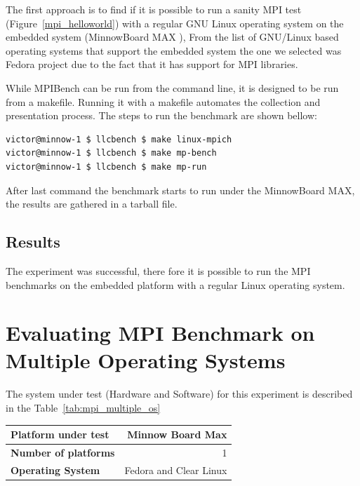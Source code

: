 The first approach is  to find if it is possible to run a sanity MPI test
(Figure~\ref{mpi_helloworld}) with a regular GNU Linux operating system on the embedded
system (MinnowBoard MAX \cite{minnowboard}),  From the list of GNU/Linux
based operating systems that support the embedded system \cite{minnowboard}
the one we selected was Fedora \cite{fedora} project due to the fact that it
has support for MPI libraries.

While MPIBench can be run from the command line, it is designed to be run from
a makefile. Running it with a makefile automates the collection and
presentation process. The steps to run the benchmark are shown bellow: 

\begin{minipage}{\textwidth}
\end{minipage}

\begin{minipage}{\textwidth}
\begin{lstlisting}[frame=single]
victor@minnow-1 $ llcbench $ make linux-mpich
victor@minnow-1 $ llcbench $ make mp-bench
victor@minnow-1 $ llcbench $ make mp-run
\end{lstlisting}
\end{minipage}

After last command the benchmark starts to run under the MinnowBoard MAX, the
results are gathered in a tarball file. 

\subsection{Results}
The experiment was successful, there fore it is possible to run the MPI
benchmarks on the embedded platform with a regular Linux operating system.

\section{Evaluating MPI Benchmark on Multiple Operating Systems}

The system under test (Hardware and Software) for this experiment is described
in the Table~\ref{tab:mpi_multiple_os}

    \begin{center}
    \begin{tabular}{ | l | r |}
        \hline
        \textbf{Platform under test} & Minnow Board  Max \\ \hline
        \textbf{Number of platforms} & 1  \\ \hline
        \textbf{Operating System} & Fedora and Clear Linux  \\ \hline
    \end{tabular}
    \label{tab:mpi_multiple_os}
    \end{center}


